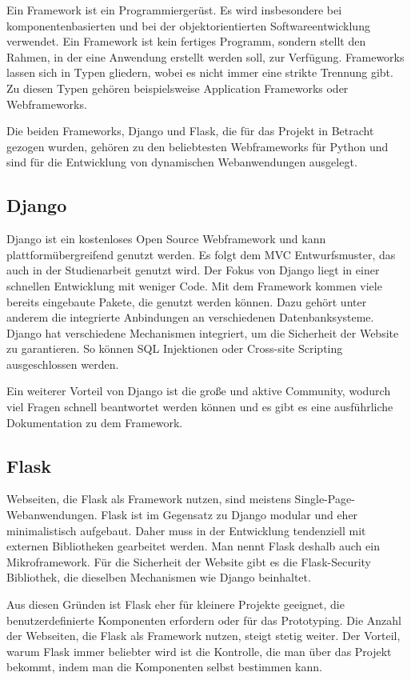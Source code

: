 Ein Framework ist ein Programmiergerüst. Es wird insbesondere bei komponentenbasierten und bei der objektorientierten Softwareentwicklung verwendet. Ein Framework ist kein fertiges Programm, sondern stellt den Rahmen, in der eine Anwendung erstellt werden soll, zur Verfügung. Frameworks lassen sich in Typen gliedern, wobei es nicht immer eine strikte Trennung gibt. Zu diesen Typen gehören beispielsweise  Application Frameworks oder Webframeworks.

Die beiden Frameworks, Django und Flask, die für das Projekt in Betracht gezogen wurden, gehören zu den beliebtesten Webframeworks für Python und sind für die Entwicklung von dynamischen Webanwendungen ausgelegt. \cite[195\psqq]{Java} \cite{stackoverflow} \cite{luber_2022}

\subsection{Django}
Django ist ein kostenloses Open Source Webframework und kann plattformübergreifend genutzt werden. Es folgt dem \ac{MVC} Entwurfsmuster, das auch in der Studienarbeit genutzt wird. Der Fokus von Django liegt in einer schnellen Entwicklung mit weniger Code. Mit dem Framework kommen viele bereits eingebaute Pakete, die genutzt werden können. Dazu gehört unter anderem die integrierte Anbindungen an verschiedenen Datenbanksysteme. Django hat verschiedene Mechanismen integriert, um die Sicherheit der Website zu garantieren. So können SQL Injektionen oder Cross-site Scripting ausgeschlossen werden.

Ein weiterer Vorteil von Django ist die große und aktive Community, wodurch viel Fragen schnell beantwortet werden können und es gibt es eine ausführliche Dokumentation zu dem Framework. \cite{herman_2022} \cite{luber_2022}

\subsection{Flask}
Webseiten, die Flask als Framework nutzen, sind meistens Single-Page-Webanwendungen. Flask ist im Gegensatz zu Django modular und eher minimalistisch aufgebaut. Daher muss in der Entwicklung tendenziell mit externen Bibliotheken gearbeitet werden. Man nennt Flask deshalb auch ein Mikroframework. Für die Sicherheit der Website gibt es die Flask-Security Bibliothek, die dieselben Mechanismen wie Django beinhaltet.

Aus diesen Gründen ist Flask eher für kleinere Projekte geeignet, die benutzerdefinierte Komponenten erfordern oder für das Prototyping. Die Anzahl der Webseiten, die Flask als Framework nutzen, steigt stetig weiter. Der Vorteil, warum Flask immer beliebter wird ist die Kontrolle, die man über das Projekt bekommt, indem man die Komponenten selbst bestimmen kann. \cite{herman_2022}

